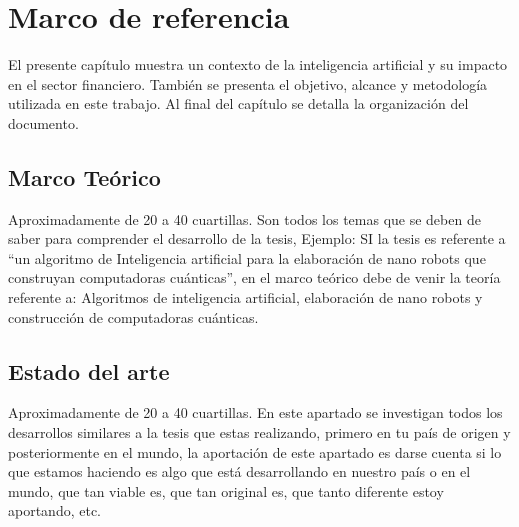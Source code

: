\chapter{Marco de referencia}\label{Cap_00}
\lettrine[lines=2,nindent=0pt]{E}{}l presente capítulo muestra un contexto de la inteligencia artificial y su impacto en el sector financiero. También se presenta el objetivo, alcance y metodología utilizada en este trabajo. Al final del capítulo se detalla la organización del documento.

\section{Marco Teórico}
Aproximadamente de 20 a 40 cuartillas. Son todos los temas que se deben de saber para comprender el desarrollo de la tesis, Ejemplo: SI la tesis es referente a “un algoritmo de Inteligencia artificial para la elaboración de nano robots que construyan computadoras cuánticas”, en el marco teórico debe de venir la teoría referente a: Algoritmos de inteligencia artificial, elaboración de nano robots y construcción de computadoras cuánticas.

\section{Estado del arte}
Aproximadamente de 20 a 40 cuartillas. En este apartado se investigan todos los desarrollos similares a la tesis que estas realizando, primero en tu país de origen y posteriormente en el mundo, la aportación de este apartado es darse cuenta si lo que estamos haciendo es algo que está desarrollando en nuestro país o en el mundo, que tan viable es, que tan original es, que tanto diferente estoy aportando, etc.
